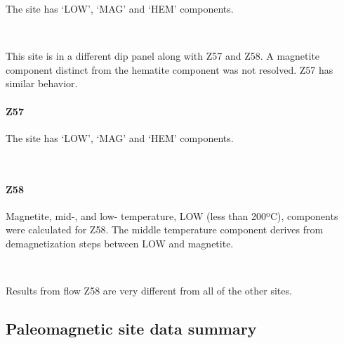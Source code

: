 \documentclass[11pt]{article}
\begin{document}
    The site has `LOW', `MAG' and `HEM' components.



    \begin{center}
    \end{center}
    { \hspace*{\fill} \\}
    
    This site is in a different dip panel along with Z57 and Z58. A
magnetite component distinct from the hematite component was not
resolved. Z57 has similar behavior.

\newpage

    \paragraph{Z57}\label{z57}

    The site has `LOW', `MAG' and `HEM' components.



    \begin{center}
    \end{center}
    { \hspace*{\fill} \\}
    
    \newpage
    
    \paragraph{Z58}\label{z58}

    Magnetite, mid-, and low- temperature, LOW (less than 200ºC), components
were calculated for Z58. The middle temperature component derives from
demagnetization steps between LOW and magnetite.



    \begin{center}
    \end{center}
    { \hspace*{\fill} \\}
    
    Results from flow Z58 are very different from all of the other sites.

    \subsection{Paleomagnetic site data
summary}\label{paleomagnetic-site-data-summary}
\end{document}
